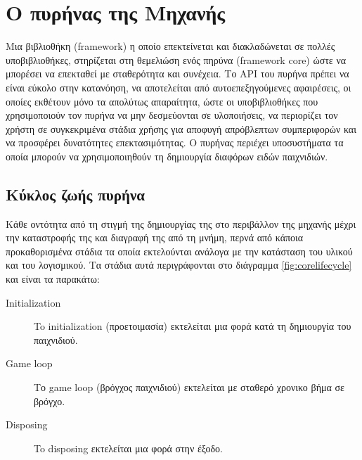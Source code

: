 	\chapter{Ο πυρήνας της Μηχανής}
	
	Μια βιβλιοθήκη (framework) η οποίο επεκτείνεται και διακλαδώνεται σε πολλές υποβιβλιοθήκες, στηρίζεται στη θεμελιώση ενός πηρύνα (framework core) ώστε να μπορέσει να επεκταθεί με σταθερότητα και συνέχεια. Το \gls{API} του πυρήνα πρέπει να είναι εύκολο στην κατανόηση, να αποτελείται από αυτοεπεξηγούμενες αφαιρέσεις, οι οποίες εκθέτουν μόνο τα απολύτως απαραίτητα, ώστε οι υποβιβλιοθήκες που χρησιμοποιούν τον πυρήνα να μην δεσμεύονται σε υλοποιήσεις, να περιορίζει τον χρήστη σε συγκεκριμένα στάδια χρήσης για αποφυγή απρόβλεπτων συμπεριφορών και να προσφέρει δυνατότητες επεκτασιμότητας.  \cite{jaroslav08} Ο πυρήνας περιέχει υποσυστήματα τα οποία μπορούν να χρησιμοποιηθούν τη δημιουργία διαφόρων ειδών παιχνιδιών.
		
	\section{Κύκλος ζωής πυρήνα}	
	Κάθε οντότητα από τη στιγμή της δημιουργίας της στο περιβάλλον της μηχανής μέχρι την καταστροφής της και διαγραφή της από τη μνήμη, περνά από κάποια προκαθορισμένα στάδια τα οποία εκτελούνται ανάλογα με την κατάσταση του υλικού και του λογισμικού. Τα στάδια αυτά περιγράφονται στο διάγραμμα \ref{fig:corelifecycle} και είναι τα παρακάτω:
	
	\begin{description}
		\item [Initialization] To initialization (προετοιμασία) εκτελείται μια φορά κατά τη δημιουργία του παιχνιδιού.
		\item [Game loop] Το game loop (βρόγχος παιχνιδιού) εκτελείται με σταθερό χρονικο βήμα σε βρόγχο.
		\item [Disposing] To disposing εκτελείται μια φορά στην έξοδο. 
	\end{description}
	
